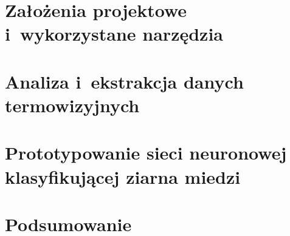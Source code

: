 \documentclass[a4paper, openright, twoside, 12pt]{report}
\begin{document}
\chapter{Założenia projektowe i~wykorzystane narzędzia}


\chapter{Analiza i~ekstrakcja danych termowizyjnych}


\chapter{Prototypowanie sieci neuronowej klasyfikującej ziarna miedzi}


\chapter{Podsumowanie} \label{ch:summary}


\begin{appendices}
    
\end{appendices}

\listoffigures
\listoftables
\listoflistings

\nocite{*}


\end{document}
